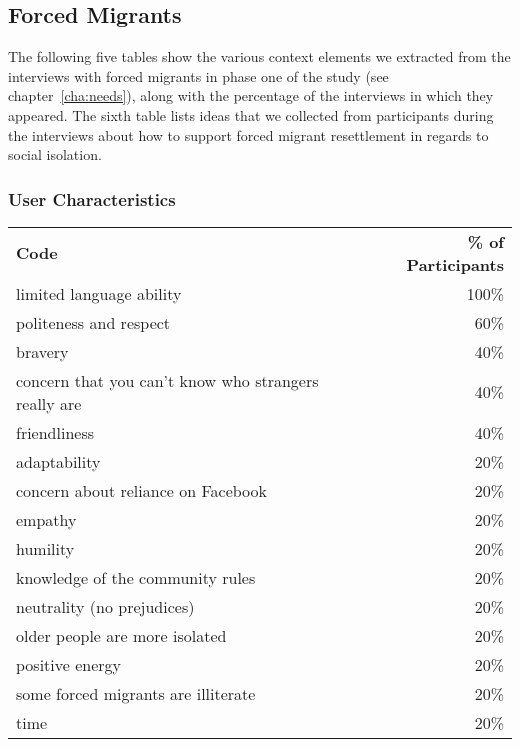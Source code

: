 \subsection{Forced Migrants}

The following five tables show the various context elements we extracted from the interviews with forced migrants in phase one of the study (see chapter~\ref{cha:needs}), along with the percentage of the interviews in which they appeared. The sixth table lists ideas that we collected from participants during the interviews about how to support forced migrant resettlement in regards to social isolation.

\subsubsection*{User Characteristics}

\begin{longtable}{p{}r}
\textbf{Code}                                        & \textbf{\% of Participants} \\
limited language ability                             & 100\%                       \\
politeness and respect                               & 60\%                        \\
bravery                                              & 40\%                        \\
concern that you can't know who strangers really are & 40\%                        \\
friendliness                                         & 40\%                        \\
adaptability                                         & 20\%                        \\
concern about reliance on Facebook                   & 20\%                        \\
empathy                                              & 20\%                        \\
humility                                             & 20\%                        \\
knowledge of the community rules                     & 20\%                        \\
neutrality (no prejudices)                           & 20\%                        \\
older people are more isolated                       & 20\%                        \\
positive energy                                      & 20\%                        \\
some forced migrants are illiterate                  & 20\%                        \\
time                                                 & 20\%
\end{longtable}

